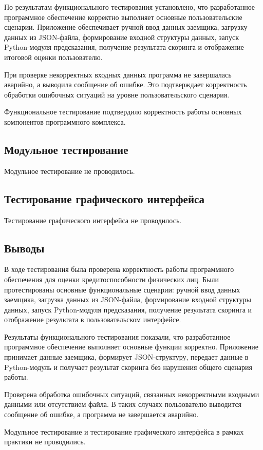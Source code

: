 \FloatBarrier

По результатам функционального тестирования установлено, что разработанное программное обеспечение корректно выполняет основные пользовательские сценарии. Приложение обеспечивает ручной ввод данных заемщика, загрузку данных из JSON-файла, формирование входной структуры данных, запуск Python-модуля предсказания, получение результата скоринга и отображение итоговой оценки пользователю.

При проверке некорректных входных данных программа не завершалась аварийно, а выводила сообщение об ошибке. Это подтверждает корректность обработки ошибочных ситуаций на уровне пользовательского сценария.

Функциональное тестирование подтвердило корректность работы основных компонентов программного комплекса.

\subsection{Модульное тестирование}

Модульное тестирование не проводилось.

\subsection{Тестирование графического интерфейса}

Тестирование графического интерфейса не проводилось.

\subsection*{Выводы}

В ходе тестирования была проверена корректность работы программного обеспечения для оценки кредитоспособности физических лиц. Были протестированы основные функциональные сценарии: ручной ввод данных заемщика, загрузка данных из JSON-файла, формирование входной структуры данных, запуск Python-модуля предсказания, получение результата скоринга и отображение результата в пользовательском интерфейсе.

Результаты функционального тестирования показали, что разработанное программное обеспечение выполняет основные функции корректно. Приложение принимает данные заемщика, формирует JSON-структуру, передает данные в Python-модуль и получает результат скоринга без нарушения общего сценария работы.

Проверена обработка ошибочных ситуаций, связанных некорректными входными данными или отсутствием файла. В таких случаях пользователю выводится сообщение об ошибке, а программа не завершается аварийно.

Модульное тестирование и тестирование графического интерфейса в рамках практики не проводились.